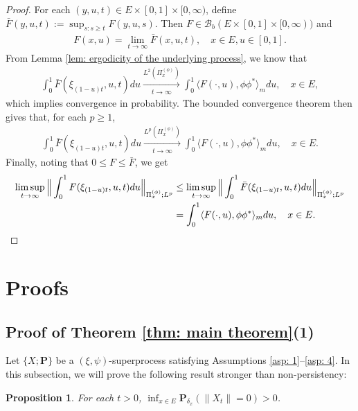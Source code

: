 \documentclass[12pt,a4paper]{amsart}
\newtheorem{prop}[thm]{Proposition}
\theoremstyle{definition}
\numberwithin{equation}{section}
\begin{document}
\begin{proof}
	For each $(y,u,t)\in E\times [0,1]\times [0,\infty)$, define $\bar F(y,u,t) := \sup_{s:s\geq t} F(y,u,s)$.
Then $F\in \mathscr B_b(E\times [0,1]\times [0,\infty))$ and
\begin{align}
	F(x,u)
	= \lim_{t\to \infty} \bar F(x,u,t),
	\quad x\in E, u\in [0,1].
\end{align}
From Lemma \ref{lem: ergodicity of the underlying process}, we know that
\begin{align}
	\int_0^1 \bar F(\xi_{(1-u)t},u,t) du
	\xrightarrow[t\to \infty]{L^2(\Pi_x^{(\phi)})}
	\int_0^1 \langle F(\cdot , u), \phi\phi^*\rangle_m du,
	\quad x\in E,
\end{align}
which implies convergence in probability.
The bounded convergence theorem then gives that, for each $p \geq 1$,
\begin{align}
	\int_0^1 \bar F(\xi_{(1-u)t},u,t) du
	\xrightarrow[t\to \infty]{L^p(\Pi_x^{(\phi)})}
	\int_0^1 \langle F(\cdot , u), \phi\phi^*\rangle_m du,
	\quad x\in E.
\end{align}
Finally, noting that $0\leq F \leq \bar F$, we get
\begin{align}
	\limsup_{ t \to \infty}  \Big\| \int_0^1 F(\xi_{(1-u) t },u,t) du  \Big\|_{\Pi_x^{(\phi)};L^p}
	&\leq \limsup_{ t \to \infty}  \Big\| \int_0^1 \bar F(\xi_{(1-u) t },u,t) du  \Big\|_{\Pi_x^{(\phi)};L^p}
	\\& = \int_0^1 \langle F(\cdot, u), \phi \phi^*\rangle_m du,
	\quad x\in E. \qedhere
\end{align}
\end{proof}

\section{Proofs}
\subsection{Proof of Theorem \ref{thm: main theorem}(1)}
\label{sec: proof of result 1}
Let $\{X; \mathbf P\}$ be a $(\xi, \psi)$-superprocess satisfying
Assumptions \ref{asp: 1}--\ref{asp: 4}.
In this subsection, we will prove the following result stronger than non-persistency:

\begin{prop} \label{prop: non-presistent}
	For each $t > 0$, $\inf_{x\in E} \mathbf P_{\delta_x}(\|X_t\|= 0) > 0$.
\end{prop}
\end{document}

